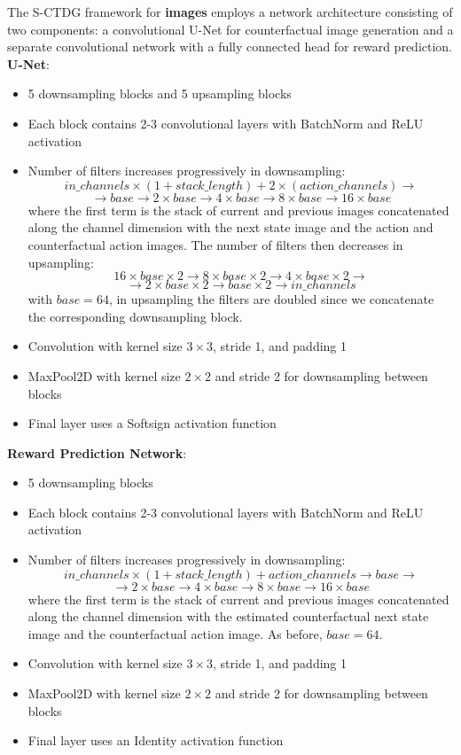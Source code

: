 The S-CTDG framework for \textbf{images} employs a network architecture
consisting of two components: a convolutional U-Net for counterfactual
image generation
and a separate convolutional network with a fully connected head for
reward prediction.\\
\textbf{U-Net}:
\begin{itemize}
    \item 5 downsampling blocks and 5 upsampling blocks
    \item Each block contains 2-3 convolutional layers
    with BatchNorm and ReLU activation
    \item Number of filters increases
    progressively in downsampling:
    $$ in\_channels \times (1 + stack\_length) + 2 \times (action\_channels)
    \rightarrow $$$$\rightarrow base \rightarrow 2
    \times base \rightarrow 4\times base \rightarrow
    8\times base \rightarrow 16\times base $$
    where the first term is the stack of current and previous images
    concatenated along the channel dimension with the next state image
    and the action and counterfactual action images.
    The number of filters then decreases in upsampling:
    $$ 16\times base \times 2 \rightarrow 8 \times base \times 2 \rightarrow
    4\times base \times 2\rightarrow$$ $$ \rightarrow 2\times base \times 2
    \rightarrow base \times 2 \rightarrow in\_channels$$
    with $base = 64$, in upsampling the filters are doubled
    since we concatenate the corresponding downsampling block.
    \item Convolution with kernel size $3\times 3$, stride 1,
    and padding 1
    \item MaxPool2D with kernel size $2\times 2$ and stride
    2 for downsampling between blocks
    \item Final layer uses a Softsign activation function
\end{itemize}
\textbf{Reward Prediction Network}:
\begin{itemize}
    \item 5 downsampling blocks
    \item Each block contains 2-3 convolutional layers
    with BatchNorm and ReLU activation
    \item Number of filters increases
    progressively in downsampling:
    $$ in\_channels \times (1 + stack\_length) + action\_channels
    \rightarrow base \rightarrow$$$$\rightarrow 2
    \times base \rightarrow 4\times base \rightarrow
    8\times base \rightarrow 16\times base $$
    where the first term is the stack of current and previous images
    concatenated along the channel dimension with the
    estimated counterfactual next state image
    and the counterfactual action image.
    As before, $base = 64$.
    \item Convolution with kernel size $3\times 3$, stride 1,
    and padding 1
    \item MaxPool2D with kernel size $2\times 2$ and stride
    2 for downsampling between blocks
    \item Final layer uses an Identity activation function
\end{itemize}

